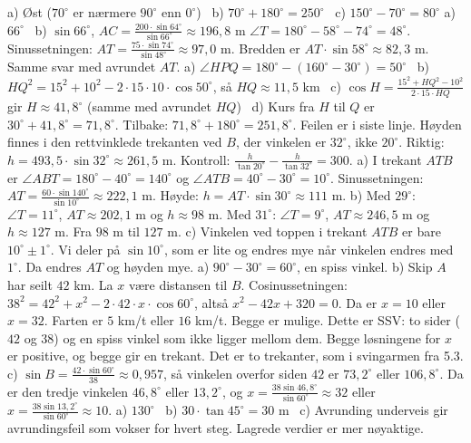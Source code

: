  a) Øst ($70^\circ$ er nærmere $90^\circ$ enn $0^\circ$) \ b) $70^\circ + 180^\circ = 250^\circ$ \ c) $150^\circ - 70^\circ = 80^\circ$
 a) $66^\circ$ \ b) $\sin 66^\circ$, $AC = \frac{200 \cdot \sin 64^\circ}{\sin 66^\circ} \approx 196,8$ m
 $\angle T = 180^\circ - 58^\circ - 74^\circ = 48^\circ$. Sinussetningen: $AT = \frac{75 \cdot \sin 74^\circ}{\sin 48^\circ} \approx 97,0$ m. Bredden er $AT \cdot \sin 58^\circ \approx 82,3$ m. Samme svar med avrundet $AT$.
 a) $\angle HPQ = 180^\circ - (160^\circ - 30^\circ) = 50^\circ$ \ b) $HQ^2 = 15^2 + 10^2 - 2 \cdot 15 \cdot 10 \cdot \cos 50^\circ$, så $HQ \approx 11,5$ km \ c) $\cos H = \frac{15^2 + HQ^2 - 10^2}{2 \cdot 15 \cdot HQ}$ gir $H \approx 41,8^\circ$ (samme med avrundet $HQ$) \ d) Kurs fra $H$ til $Q$ er $30^\circ + 41,8^\circ = 71,8^\circ$. Tilbake: $71,8^\circ + 180^\circ = 251,8^\circ$.
 Feilen er i siste linje. Høyden finnes i den rettvinklede trekanten ved $B$, der vinkelen er $32^\circ$, ikke $20^\circ$. Riktig: $h = 493,5 \cdot \sin 32^\circ \approx 261,5$ m. Kontroll: $\frac{h}{\tan 20^\circ} - \frac{h}{\tan 32^\circ} = 300$.
 a) I trekant $ATB$ er $\angle ABT = 180^\circ - 40^\circ = 140^\circ$ og $\angle ATB = 40^\circ - 30^\circ = 10^\circ$. Sinussetningen: $AT = \frac{60 \cdot \sin 140^\circ}{\sin 10^\circ} \approx 222,1$ m. Høyde: $h = AT \cdot \sin 30^\circ \approx 111$ m.
b) Med $29^\circ$: $\angle T = 11^\circ$, $AT \approx 202,1$ m og $h \approx 98$ m. Med $31^\circ$: $\angle T = 9^\circ$, $AT \approx 246,5$ m og $h \approx 127$ m. Fra $98$ m til $127$ m.
c) Vinkelen ved toppen i trekant $ATB$ er bare $10^\circ \pm 1^\circ$. Vi deler på $\sin 10^\circ$, som er lite og endres mye når vinkelen endres med $1^\circ$. Da endres $AT$ og høyden mye.
 a) $90^\circ - 30^\circ = 60^\circ$, en spiss vinkel.
b) Skip $A$ har seilt $42$ km. La $x$ være distansen til $B$. Cosinussetningen: $38^2 = 42^2 + x^2 - 2 \cdot 42 \cdot x \cdot \cos 60^\circ$, altså $x^2 - 42x + 320 = 0$. Da er $x = 10$ eller $x = 32$. Farten er $5$ km/t eller $16$ km/t. Begge er mulige. Dette er SSV: to sider ($42$ og $38$) og en spiss vinkel som ikke ligger mellom dem. Begge løsningene for $x$ er positive, og begge gir en trekant. Det er to trekanter, som i svingarmen fra 5.3.
c) $\sin B = \frac{42 \cdot \sin 60^\circ}{38} \approx 0,957$, så vinkelen overfor siden $42$ er $73,2^\circ$ eller $106,8^\circ$. Da er den tredje vinkelen $46,8^\circ$ eller $13,2^\circ$, og $x = \frac{38 \sin 46,8^\circ}{\sin 60^\circ} \approx 32$ eller $x = \frac{38 \sin 13,2^\circ}{\sin 60^\circ} \approx 10$.
 a) $130^\circ$ \ b) $30 \cdot \tan 45^\circ = 30$ m \ c) Avrunding underveis gir avrundingsfeil som vokser for hvert steg. Lagrede verdier er mer nøyaktige.

